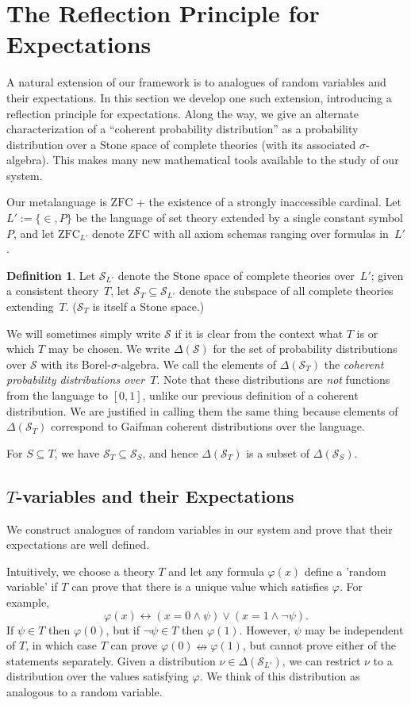 \documentclass[12pt]{article}
\newcommand{\vp}{\varphi}
\newcommand{\zfc}{\mathrm{ZFC}}
\newcommand{\zfcl}{{\zfc_{\cL}}}
\newcommand{\cSL}{{\cS_{\cL}}}
\newcommand{\cL}{L'}
\newcommand{\cS}{\mathcal{S}}
\newcommand{\Tvar}{$T$-variable}
\theoremstyle{plain}
\theoremstyle{definition}
\newtheorem{definition}[theorem]{Definition}
\theoremstyle{remark}
\begin{document}
\section{The Reflection Principle for Expectations}
\label{refl-exp}
A natural extension of our framework is to analogues of random variables and their expectations. 
In this section we develop one such extension, introducing a reflection principle for expectations.
Along the way, we give an alternate characterization of a ``coherent probability distribution'' as a probability distribution over a Stone space of complete theories (with its associated $\sigma$-algebra). This makes many new mathematical tools available to the study of our system.

Our metalanguage is $\zfc$ + the existence of a strongly inaccessible cardinal.
Let $\cL := \{\in,P\}$ be the language of set theory extended by a single constant symbol $P$, and let $\zfcl$ denote $\zfc$ with all axiom schemas ranging over formulas in~$\cL$.
\begin{definition}
Let $\cSL$ denote the Stone space of complete theories over~$\cL$; given a consistent theory~$T$, let $\cS_T\subseteq\cSL$ denote the subspace of all complete theories extending~$T$. ($\cS_T$ is itself a Stone space.) 

We will sometimes simply write $\cS$ if it is clear from the context what $T$ is or which $T$ may be chosen.
We write $\Delta(\cS)$ for the set of probability distributions over $\cS$ with its Borel-$\sigma$-algebra.
We call the elements of $\Delta(\cS_T)$ the \emph{coherent probability distributions over~$T$}. 
Note that these distributions are \emph{not} functions from the language to $[0,1]$, unlike our previous definition of a coherent distribution. 
We are justified in calling them the same thing because elements of $\Delta(\cS_T)$ correspond to Gaifman coherent distributions over the language.
\end{definition}
For $S\subseteq T$, we have $\cS_T\subseteq\cS_S$, and hence $\Delta(\cS_T)$ is a subset of $\Delta(\cS_S)$.
\subsection{\Tvar{}s and their Expectations}
We construct analogues of random variables in our system and prove that their expectations are well defined.

Intuitively, we choose a theory $T$ and let any formula $\vp(x)$ define a 'random variable' if $T$ can prove that there is a unique value which satisfies $\vp$. For example,
$$\vp(x) \leftrightarrow (x = 0 \wedge \psi) \vee (x = 1 \wedge \neg \psi).$$
If $\psi\in T$ then $\vp(0)$, but if $\neg \psi\in T$ then $\vp(1)$. 
However, $\psi$ may be independent of $T$, in which case $T$ can prove $\vp(0) \nleftrightarrow \vp(1)$, but cannot prove either of the statements separately.
Given a distribution $\nu\in \Delta(\cSL)$, we can restrict $\nu$ to a distribution over the values satisfying $\vp$.
We think of this distribution as analogous to a random variable.
\end{document}
